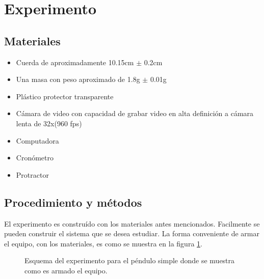 \documentclass[aps,twocolumn,secnumarabic,nobalancelastpage,amsmath,amssymb,nofootinbib]{revtex4-1}
\begin{document}
		       
	\section{Experimento}
		\subsection{Materiales}
			\begin{itemize}
				\item Cuerda de aproximadamente 10.15cm $\pm$ 0.2cm
				\item Una masa con peso aproximado de 1.8g $\pm$ 0.01g  
				\item Pl\'astico protector transparente
				\item C\'amara de video con capacidad de grabar video en alta definici\'on a c\'amara lenta de 32x(960 fps)
				\item Computadora
				\item Cron\'ometro
				\item Protractor
			\end{itemize}
		\subsection{Procedimiento y m\'etodos}
			El experimento es constru\'ido con los materiales antes mencionados. Facilmente se pueden construir el sistema que se desea estudiar. La forma conveniente de armar el equipo, con los materiales, es como se muestra en la figura \ref{fig:esquemaExp}.
			\begin{figure}[!htb]
				\caption{Esquema del experimento para el p\'endulo simple donde se muestra como es armado el equipo.}
				\label{fig:esquemaExp}
			\end{figure} 
		
\end{document}
